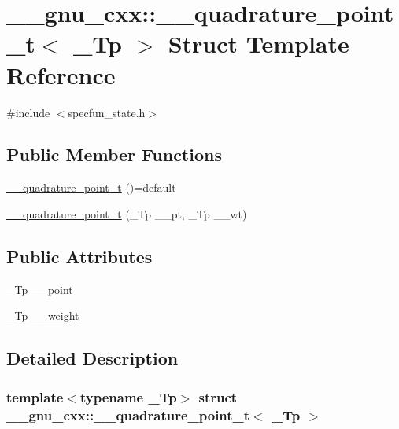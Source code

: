 \hypertarget{struct____gnu__cxx_1_1____quadrature__point__t}{}\section{\+\_\+\+\_\+gnu\+\_\+cxx\+:\+:\+\_\+\+\_\+quadrature\+\_\+point\+\_\+t$<$ \+\_\+\+Tp $>$ Struct Template Reference}
\label{struct____gnu__cxx_1_1____quadrature__point__t}


{\ttfamily \#include $<$specfun\+\_\+state.\+h$>$}

\subsection*{Public Member Functions}
\begin{DoxyCompactItemize}
\item 
\hyperlink{struct____gnu__cxx_1_1____quadrature__point__t_a77da59f678e286f58b484a4a1660ae32}{\+\_\+\+\_\+quadrature\+\_\+point\+\_\+t} ()=default
\item 
\hyperlink{struct____gnu__cxx_1_1____quadrature__point__t_a8f95b11c504ccdaee11c361e01ad9a9e}{\+\_\+\+\_\+quadrature\+\_\+point\+\_\+t} (\+\_\+\+Tp \+\_\+\+\_\+pt, \+\_\+\+Tp \+\_\+\+\_\+wt)
\end{DoxyCompactItemize}
\subsection*{Public Attributes}
\begin{DoxyCompactItemize}
\item 
\+\_\+\+Tp \hyperlink{struct____gnu__cxx_1_1____quadrature__point__t_a9cbd1d0da59243a75be37c3b54ce7a30}{\+\_\+\+\_\+point}
\item 
\+\_\+\+Tp \hyperlink{struct____gnu__cxx_1_1____quadrature__point__t_a231e04e186e8e45b431876cc958a81c2}{\+\_\+\+\_\+weight}
\end{DoxyCompactItemize}


\subsection{Detailed Description}
\subsubsection*{template$<$typename \+\_\+\+Tp$>$\newline
struct \+\_\+\+\_\+gnu\+\_\+cxx\+::\+\_\+\+\_\+quadrature\+\_\+point\+\_\+t$<$ \+\_\+\+Tp $>$}

